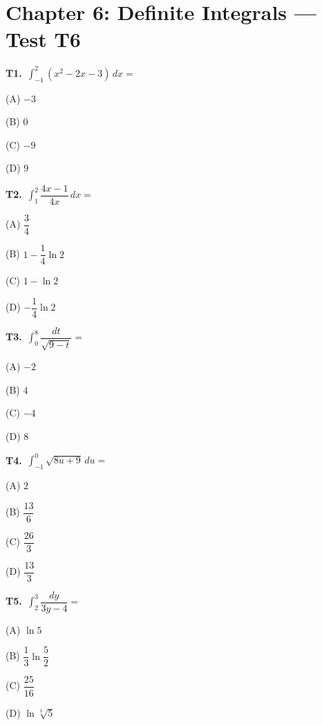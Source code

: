 \documentclass[11pt]{article}
\begin{document}
\section*{Chapter 6: Definite Integrals --- Test T6}

\bigskip\noindent\textbf{T1.}\ $\displaystyle\int_{-1}^{2} (x^2-2x-3)\,dx =$
\begin{list}{}{\setlength{\leftmargin}{3em}\setlength{\labelwidth}{2.5em}\setlength{\itemsep}{0pt}\setlength{\topsep}{2pt}}
\item[(A)] $-3$
\item[(B)] $0$
\item[(C)] $-9$
\item[(D)] $9$
\end{list}

\bigskip\noindent\textbf{T2.}\ $\displaystyle\int_{1}^{2} \dfrac{4x-1}{4x}\,dx =$
\begin{list}{}{\setlength{\leftmargin}{3em}\setlength{\labelwidth}{2.5em}\setlength{\itemsep}{0pt}\setlength{\topsep}{2pt}}
\item[(A)] $\dfrac{3}{4}$
\item[(B)] $1-\dfrac{1}{4}\ln 2$
\item[(C)] $1-\ln 2$
\item[(D)] $-\dfrac{1}{4}\ln 2$
\end{list}

\bigskip\noindent\textbf{T3.}\ $\displaystyle\int_{0}^{8} \dfrac{dt}{\sqrt{9-t}} =$
\begin{list}{}{\setlength{\leftmargin}{3em}\setlength{\labelwidth}{2.5em}\setlength{\itemsep}{0pt}\setlength{\topsep}{2pt}}
\item[(A)] $-2$
\item[(B)] $4$
\item[(C)] $-4$
\item[(D)] $8$
\end{list}

\bigskip\noindent\textbf{T4.}\ $\displaystyle\int_{-1}^{0} \sqrt{8u+9}\,du =$
\begin{list}{}{\setlength{\leftmargin}{3em}\setlength{\labelwidth}{2.5em}\setlength{\itemsep}{0pt}\setlength{\topsep}{2pt}}
\item[(A)] $2$
\item[(B)] $\dfrac{13}{6}$
\item[(C)] $\dfrac{26}{3}$
\item[(D)] $\dfrac{13}{3}$
\end{list}

\bigskip\noindent\textbf{T5.}\ $\displaystyle\int_{2}^{3} \dfrac{dy}{3y-4} =$
\begin{list}{}{\setlength{\leftmargin}{3em}\setlength{\labelwidth}{2.5em}\setlength{\itemsep}{0pt}\setlength{\topsep}{2pt}}
\item[(A)] $\ln 5$
\item[(B)] $\dfrac{1}{3}\ln\dfrac{5}{2}$
\item[(C)] $\dfrac{25}{16}$
\item[(D)] $\ln\sqrt[3]{5}$
\end{list}
\end{document}
